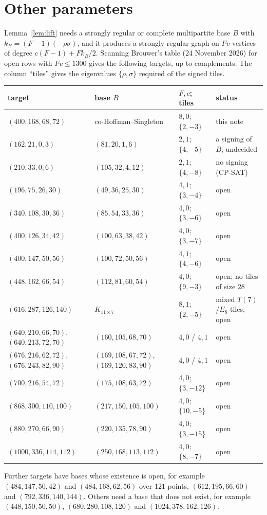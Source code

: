 \documentclass[11pt]{amsart}
\theoremstyle{remark}
\begin{document}
\section{Other parameters}\label{sec:other}

Lemma~\ref{lem:lift} needs a strongly regular or complete multipartite base $B$ with $k_B=(F-1)(-\rho\sigma)$, and it produces a strongly regular graph on $Fv$ vertices of degree $c(F-1)+Fk_B/2$. Scanning Brouwer's table (24 November 2026) for open rows with $Fv\le1300$ gives the following targets, up to complements. The column ``tiles'' gives the eigenvalues $\{\rho,\sigma\}$ required of the signed tiles.
\begin{center}\small
\begin{tabular}{p{}p{}p{}p{}}
\toprule
target & base $B$ & $F,c$; tiles & status\\
\midrule
$(400,168,68,72)$ & co-Hoffman--Singleton & $8,0$; $\{2,-3\}$ & this note\\
$(162,21,0,3)$ & $(81,20,1,6)$ & $2,1$; $\{4,-5\}$ & a signing of $B$; undecided\\
$(210,33,0,6)$ & $(105,32,4,12)$ & $2,1$; $\{4,-8\}$ & no signing (CP-SAT)\\
$(196,75,26,30)$ & $(49,36,25,30)$ & $4,1$; $\{3,-4\}$ & open\\
$(340,108,30,36)$ & $(85,54,33,36)$ & $4,0$; $\{3,-6\}$ & open\\
$(400,126,34,42)$ & $(100,63,38,42)$ & $4,0$; $\{3,-7\}$ & open\\
$(400,147,50,56)$ & $(100,72,50,56)$ & $4,1$; $\{4,-6\}$ & open\\
$(448,162,66,54)$ & $(112,81,60,54)$ & $4,0$; $\{9,-3\}$ & open; no tiles of size $28$\\
$(616,287,126,140)$ & $K_{11\times7}$ & $8,1$; $\{2,-5\}$ & mixed $T(7)$/$E_8$ tiles, open\\
$(640,210,66,70)$, $(640,213,72,70)$ & $(160,105,68,70)$ & $4,0$ / $4,1$ & open\\
$(676,216,62,72)$, $(676,243,82,90)$ & $(169,108,67,72)$, $(169,120,83,90)$ & $4,0$ / $4,1$ & open\\
$(700,216,54,72)$ & $(175,108,63,72)$ & $4,0$; $\{3,-12\}$ & open\\
$(868,300,110,100)$ & $(217,150,105,100)$ & $4,0$; $\{10,-5\}$ & open\\
$(880,270,66,90)$ & $(220,135,78,90)$ & $4,0$; $\{3,-15\}$ & open\\
$(1000,336,114,112)$ & $(250,168,113,112)$ & $4,0$; $\{8,-7\}$ & open\\
\bottomrule
\end{tabular}
\end{center}
\begin{sloppypar}\noindent Further targets have bases whose existence is open, for example $(484,147,50,42)$ and $(484,168,62,56)$ over $121$ points, $(612,195,66,60)$ and $(792,336,140,144)$. Others need a base that does not exist, for example $(448,150,50,50)$, $(680,280,108,120)$ and $(1024,378,162,126)$.\end{sloppypar}
\end{document}
